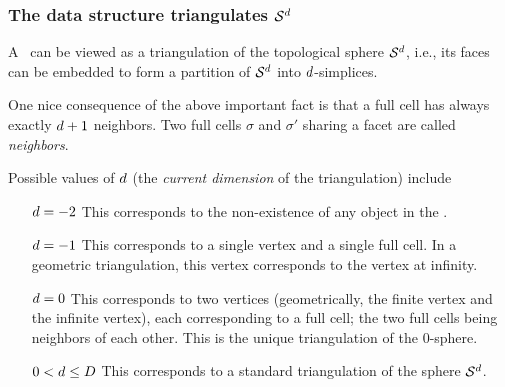 %

\subsubsection{The data structure triangulates $\mathcal S^{d}$}

A \tds\ can be viewed as
a {triangulation} of the topological sphere $\mathcal S^{d}$,
i.e., its faces can be embedded to form a partition of
$\mathcal S^{d}$ into $d$-simplices. 


One nice consequence of the above important fact is that a full cell has
always exactly  $d+1$ neighbors.
Two  full cells $\sigma$ and $\sigma'$ sharing a facet are called
{\em neighbors}.


Possible values of $d$ (the \emph{current dimension} of the triangulation) include
\begin{itemize}
\item[$d=-2$] This corresponds to the non-existence of any object in
  the \tds.
\item[$d=-1$] This corresponds to a single vertex and a single full cell. In a
geometric triangulation, this vertex corresponds to the vertex at infinity.
\item[$d=0$] This corresponds to two vertices (geometrically, the finite vertex and
  the infinite vertex), each corresponding to  a full cell;
the two full cells being neighbors of each other. This is the unique
triangulation of the $0$-sphere.
\item[$0<d\le D$] This corresponds to a standard triangulation of
the sphere $\mathcal S^{d}$.
\end{itemize}

